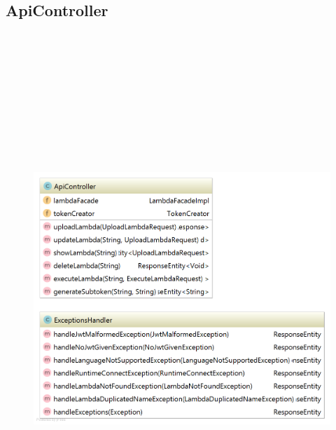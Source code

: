 \documentclass[a4paper,20pt,oneside]{book}
\begin{document}
    \subsection{ApiController}
	    \begin{figure}[!hb]
	    	\includegraphics[width=18cm,height=20cm]{controllerdiagram}
	    \end{figure}
\end{document}
